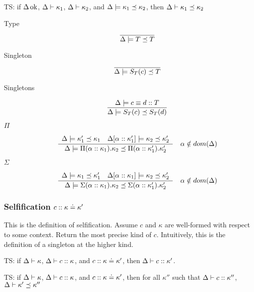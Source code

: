 \documentclass[12pt,twoside,fleqn]{amsart}
\theoremstyle{plain}
\theoremstyle{plain}
\theoremstyle{definition}
\begin{document}
TS: if \( \Delta  \, \mathrm{ok} \), \( \Delta  \vdash \kappa _{1}   \), \( \Delta  \vdash \kappa _{2}   \),
and \( \Delta  \models \kappa _{1}  \preceq \kappa _{2}  \), then \( \Delta  \vdash \kappa _{1}   \preceq \kappa _{2}   \)

\begin{description}
\item [Type]
\[
\overline{\Delta  \models T \preceq T }\]

\item [Singleton]
\[
\overline{\Delta  \models S_{T}(c ) \preceq T }\]

\item [Singletons]
\[
\frac{\Delta  \models c \equiv d ::T }{\Delta  \models S_{T}(c ) \preceq S_{T}(d ) }\]

\item [\( \Pi  \)]
\[
\frac{\begin{array}{ll}
\Delta  \models \kappa _{1}' \preceq \kappa _{1} & \Delta [\alpha ::\kappa _{1}'] \models \kappa _{2} \preceq \kappa _{2}'
\end{array} }{\Delta  \models \Pi (\alpha ::\kappa _{1}).\kappa _{2} \preceq \Pi (\alpha ::\kappa _{1}').\kappa _{2}' }\quad \alpha \notin dom(\Delta )\]

\item [\( \Sigma  \)]
\[
\frac{\begin{array}{ll}
\Delta  \models \kappa _{1} \preceq \kappa _{1}' & \Delta [\alpha ::\kappa _{1}] \models \kappa _{2} \preceq \kappa _{2}'
\end{array} }{\Delta  \models \Sigma (\alpha ::\kappa _{1}).\kappa _{2} \preceq \Sigma (\alpha ::\kappa _{1}').\kappa _{2}' }\quad \alpha \notin dom(\Delta )\]

\end{description}

\subsubsection{Selfification \protect\( c ::\kappa  \doteq \kappa '\protect \)}

This is the definition of selfification. Assume \( c \) and \( \kappa  \)
are well-formed with respect to some context. Return the most precise kind of
\( c \). Intuitively, this is the definition of a singleton at the higher kind. 

TS: if \( \Delta  \vdash \kappa   \), \( \Delta  \vdash c  ::\kappa   \), and \( c ::\kappa  \doteq \kappa ' \),
then \( \Delta  \vdash c  ::\kappa '  \).

TS: if \( \Delta  \vdash \kappa   \), \( \Delta  \vdash c  ::\kappa   \), and \( c ::\kappa  \doteq \kappa ' \),
then for all \( \kappa '' \) such that \( \Delta  \vdash c  ::\kappa ''  \), \( \Delta  \vdash \kappa '  \preceq \kappa ''  \) 
\end{document}
